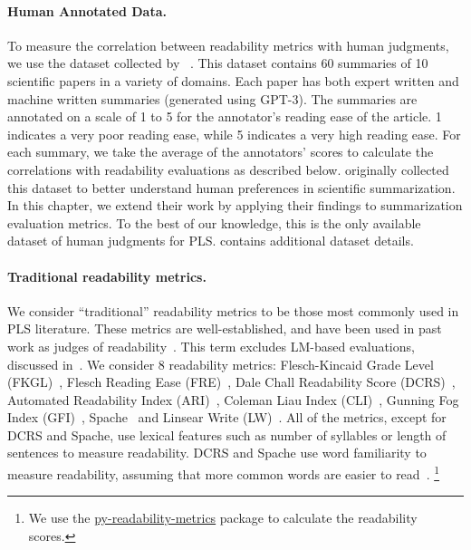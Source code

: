 \paragraph{Human Annotated Data.} 
To measure the correlation between readability metrics with human judgments, we use the dataset collected by ~\textcite{August2024KnowYA}. This dataset contains 60 summaries of 10 scientific papers in a variety of domains. Each paper has both expert written and machine written summaries (generated using GPT-3). The summaries are annotated on a scale of 1 to 5 for the annotator's reading ease of the article. 1 indicates a very poor reading ease, while 5 indicates a very high reading ease. For each summary, we take the average of the annotators' scores to calculate the correlations with readability evaluations as described below. \textcite{August2024KnowYA} originally collected this dataset to better understand human preferences in scientific summarization. In this chapter, we extend their work by applying their findings to summarization evaluation metrics. To the best of our knowledge, this is the only available dataset of human judgments for PLS.  contains additional dataset details. 


\paragraph{Traditional readability metrics.} We consider ``traditional'' readability metrics to be those most commonly used in PLS literature. These metrics are well-established, and have been used in past work as judges of readability~\cite{chandrasekaran2020overview}. This term excludes LM-based evaluations, discussed in~.
We consider 8 readability metrics: Flesch-Kincaid Grade Level (FKGL)~\cite{flesch1952simplification}, Flesch Reading Ease (FRE)~\cite{Flesch1943MarksOR}, Dale Chall Readability Score (DCRS)~\cite{dale1948formula}, Automated Readability Index (ARI)~\cite{smith1967automated}, Coleman Liau Index (CLI)~\cite{Coleman1975ACR}, Gunning Fog Index (GFI)~\cite{Gunning1968TheTO}, Spache~\cite{spache1953new} and Linsear Write (LW)~\cite{o1966gobbledygook}.
All of the metrics, except for DCRS and Spache, use lexical features such as number of syllables or length of sentences to measure readability. DCRS and Spache use word familiarity to measure readability, assuming that more common words are easier to read~\cite{dale1948formula,o1966gobbledygook}.%
\footnote{We use the \href{https://github.com/cdimascio/py-readability-metrics}{py-readability-metrics} package to calculate the readability scores.} %



